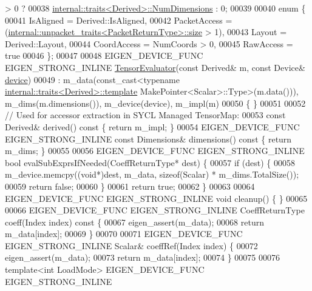 \begin{DoxyCode}
       > 0 ?
00038                                \hyperlink{struct_eigen_1_1internal_1_1traits}{internal::traits<Derived>::NumDimensions}
       : 0;
00039 
00040   \textcolor{keyword}{enum} \{
00041     IsAligned = Derived::IsAligned,
00042     PacketAccess = (\hyperlink{struct_eigen_1_1internal_1_1unpacket__traits}{internal::unpacket\_traits<PacketReturnType>::size}
       > 1),
00043     Layout = Derived::Layout,
00044     CoordAccess = NumCoords > 0,
00045     RawAccess = \textcolor{keyword}{true}
00046   \};
00047 
00048   EIGEN\_DEVICE\_FUNC EIGEN\_STRONG\_INLINE \hyperlink{struct_eigen_1_1_tensor_evaluator}{TensorEvaluator}(\textcolor{keyword}{const} Derived& m, \textcolor{keyword}{const} Device& 
      \hyperlink{struct_eigen_1_1_tensor_evaluator_a98b51809ed8f7a1f736eb7b952b9636e}{device})
00049       : m\_data(\textcolor{keyword}{const\_cast<}typename \hyperlink{struct_eigen_1_1internal_1_1traits}{internal::traits<Derived>::template} 
      MakePointer<Scalar>::Type\textcolor{keyword}{>}(m.data())), m\_dims(m.dimensions()), m\_device(device), m\_impl(m)
00050   \{ \}
00051 
00052   \textcolor{comment}{// Used for accessor extraction in SYCL Managed TensorMap:}
00053   \textcolor{keyword}{const} Derived& derived()\textcolor{keyword}{ const }\{ \textcolor{keywordflow}{return} m\_impl; \}
00054   EIGEN\_DEVICE\_FUNC EIGEN\_STRONG\_INLINE \textcolor{keyword}{const} Dimensions& dimensions()\textcolor{keyword}{ const }\{ \textcolor{keywordflow}{return} m\_dims; \}
00055 
00056   EIGEN\_DEVICE\_FUNC EIGEN\_STRONG\_INLINE \textcolor{keywordtype}{bool} evalSubExprsIfNeeded(CoeffReturnType* dest) \{
00057     \textcolor{keywordflow}{if} (dest) \{
00058       m\_device.memcpy((\textcolor{keywordtype}{void}*)dest, m\_data, \textcolor{keyword}{sizeof}(Scalar) * m\_dims.TotalSize());
00059       \textcolor{keywordflow}{return} \textcolor{keyword}{false};
00060     \}
00061     \textcolor{keywordflow}{return} \textcolor{keyword}{true};
00062   \}
00063 
00064   EIGEN\_DEVICE\_FUNC EIGEN\_STRONG\_INLINE \textcolor{keywordtype}{void} cleanup() \{ \}
00065 
00066   EIGEN\_DEVICE\_FUNC EIGEN\_STRONG\_INLINE CoeffReturnType coeff(Index index)\textcolor{keyword}{ const }\{
00067     eigen\_assert(m\_data);
00068     \textcolor{keywordflow}{return} m\_data[index];
00069   \}
00070 
00071   EIGEN\_DEVICE\_FUNC EIGEN\_STRONG\_INLINE Scalar& coeffRef(Index index) \{
00072     eigen\_assert(m\_data);
00073     \textcolor{keywordflow}{return} m\_data[index];
00074   \}
00075 
00076   \textcolor{keyword}{template}<\textcolor{keywordtype}{int} LoadMode> EIGEN\_DEVICE\_FUNC EIGEN\_STRONG\_INLINE

\end{DoxyCode}
